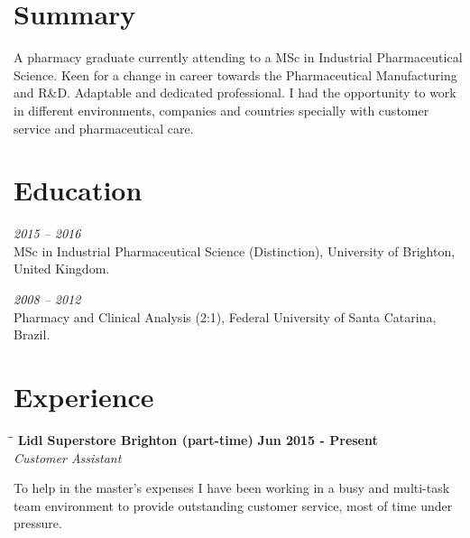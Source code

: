 \documentclass[margin]{res}
\begin{document}
  

\address{Brighton, UK \\ gra.gadotti@gmail.com \\ Phone: +44 07405105756 \\ Post Code: BN21HF }
                           
                        
\begin{resume}                        
 
\section{Summary} A pharmacy graduate currently attending to a MSc in Industrial Pharmaceutical Science.
Keen for a change in career towards the Pharmaceutical Manufacturing and R\&D. Adaptable and dedicated
professional. I had the opportunity to work in different environments, companies and countries
specially with customer service and pharmaceutical care.
 
\section{Education}
\textit{2015 – 2016}\\
MSc in Industrial Pharmaceutical Science (Distinction), University of Brighton, United Kingdom.

\textit{2008 – 2012}\\
Pharmacy and Clinical Analysis (2:1), Federal University of Santa Catarina, Brazil.

\section{Experience}

\vspace{-0.1in}
   \begin{tabbing}
   \hspace{2.3in}\= \hspace{1.7in}\= \kill %
    \textbf{Lidl Superstore Brighton (part-time)} \>\>\textbf{Jun 2015 - Present}\\
    \textit{Customer Assistant}\\        
   \end{tabbing}\vspace{-20pt}      %
To help in the master's expenses I have been working in a busy and multi-task team environment to provide
outstanding customer service, most of time under pressure.


\end{resume}
\end{document}
